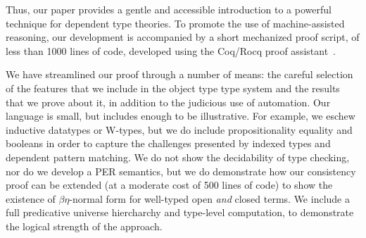 \documentclass[acmsmall,screen=true,
\ifpublic review=false\else,review=true\fi
  ,anonymous=\ifanonymous true\else false\fi]{acmart}
\newcommand{\lang}{$\lambda^H$\xspace}
\newcommand{\scw}[1]{}
\newcommand{\yl}[1]{}
\begin{document}
Thus, our paper provides a gentle and accessible introduction to a powerful
technique for dependent type theories. To promote the use of machine-assisted
reasoning, our development is accompanied by a short mechanized proof script,
of less than 1000 lines of code, developed using the Coq/Rocq proof
assistant~\cite{coq}.

We have streamlined our proof through a number of means: the careful selection
of the features that we include in the object type type system and the results
that we prove about it, in addition to the judicious use of automation.  Our
language is small, but includes enough to be illustrative. For example, we
eschew inductive datatypes or W-types, but we do include propositionality
equality and booleans in order to capture the challenges presented by indexed
types and dependent pattern matching. We do not show the decidability of type
checking, nor do we develop a PER semantics, but we do demonstrate how our
consistency proof can be extended (at a moderate cost of 500 lines of code) to
show the existence of $\beta\eta$-normal form for well-typed open \emph{and}
closed terms. We include a full predicative universe hiercharchy and
type-level computation, to demonstrate the logical strength of the
approach. %
\end{document}
